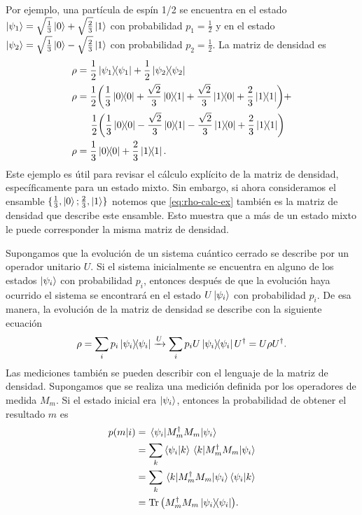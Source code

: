 \documentclass[11pt,dvipsnames]{report}
\newcommand{\psii}{\psi_i}
\begin{document}
Por ejemplo, una partícula de espín 1/2 se encuentra en el estado 
$\ket{\psi_1}=\sqrt{\frac{1}{3}}\ket{0} + \sqrt{\frac{2}{3}}\ket{1}$
con probabilidad $p_1=\frac{1}{2}$ y en el estado 
$\ket{\psi_2}=\sqrt{\frac{1}{3}}\ket{0} - \sqrt{\frac{2}{3}}\ket{1}$
con probabilidad $p_2=\frac{1}{2}$. La matriz de densidad es
\begin{align}
	\rho 	&= \frac{1}{2}\dyad{\psi_1}{\psi_1} + 
	\frac{1}{2}\dyad{\psi_2}{\psi_2} \nonumber \\
	\rho	&= \frac{1}{2}\qty(\frac{1}{3}\dyad{0}{0} +
					 \frac{\sqrt{2}}{3}\dyad{0}{1} + 
					 \frac{\sqrt{2}}{3}\dyad{1}{0} +
					 \frac{2}{3}\dyad{1}{1}) + \nonumber \\
				&\hspace{5mm} \frac{1}{2}\qty(\frac{1}{3}\dyad{0}{0} -
					 \frac{\sqrt{2}}{3}\dyad{0}{1} -
					 \frac{\sqrt{2}}{3}\dyad{1}{0} +
					 \frac{2}{3}\dyad{1}{1}) \nonumber \\
	\rho	&= \frac{1}{3}\dyad{0}{0} + \frac{2}{3}\dyad{1}{1}. 
	\label{eq:rho-calc-ex}
\end{align}
Este ejemplo es útil para revisar el cálculo explícito de
la matriz de densidad, específicamente para un estado mixto. Sin
embargo, si ahora consideramos el ensamble $\{ \frac{1}{3}, \ket{0};
\frac{2}{3}, \ket{1} \}$ notemos que \eqref{eq:rho-calc-ex} también es la
matriz de densidad que describe este ensamble. Esto muestra que a más de un
estado mixto le puede corresponder la misma matriz de densidad.\newline

Supongamos que la evolución de un sistema cuántico cerrado se describe por
un operador unitario $U$. Si el sistema inicialmente se encuentra en alguno
de los estados $\ket{\psii}$ con probabilidad $p_i$, entonces después de que
la evolución haya ocurrido el sistema se encontrará en el estado $U\ket{\psii}$ 
con probabilidad $p_i$. De esa manera, la evolución de la matriz de densidad se
describe con la siguiente ecuación 
\begin{align}
	\rho = \sum _ip_i\dyad{\psii}{\psii}
	\xrightarrow[]{U}
	\sum _ip_iU\dyad{\psii}{\psii}U^{\dagger}	=
	U\rho U^{\dagger}.
\end{align}
Las mediciones también se pueden describir con el lenguaje de la matriz de
densidad. Supongamos que se realiza una medición definida por los
operadores de medida $M_m$. Si el estado inicial era $\ket{\psii}$, 
entonces la probabilidad de obtener el resultado $m$ es
\begin{align}
	p\qty(m|i) &= \matrixel{\psii}{M_m^{\dagger}M_m}{\psii}\\
	&= \sum _k \braket{\psii}{k}\matrixel{k}{M_m^{\dagger}M_m}{\psii}\\
	&=\sum _k \matrixel{k}{M_m^{\dagger}M_m}{\psii}\braket{\psii}{k}\\
	&=\Tr \qty(M_m^{\dagger}M_m\dyad{\psii}{\psii}).
\end{align}
\end{document}

